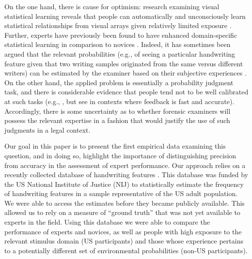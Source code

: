 \documentclass[doc]{apa6} %
\begin{document}
On the one hand, there is cause for optimism: research examining visual statistical learning reveals that people can automatically and unconsciously learn statistical relationships from visual arrays given relatively limited exposure \cite{Fiser2001,fiser2002,turkbrowne2005}. Further, experts have previously been found to have enhanced domain-specific statistical learning in comparison to novices \cite{schon2011musicalexpertise}. Indeed, it has sometimes been argued that the relevant probabilities (e.g., of seeing a particular handwriting feature given that two writing samples originated from the same versus different writers) can be estimated by the examiner based on their subjective experiences \cite{Biedermann2013}. On the other hand, the applied problem is essentially a probability judgment task, and there is considerable evidence that people tend not to be well calibrated at such tasks (e.g., , but see  in contexts where feedback is fast and accurate). Accordingly, there is some uncertainty as to whether forensic examiners will possess the relevant expertise in a fashion that would justify the use of such judgments in a legal context.

Our goal in this paper is to present the first empirical data examining this question, and in doing so, highlight the importance of distinguishing precision from accuracy in the assessment of expert performance. Our approach relies on a recently collected database of handwriting features \cite{johnson2016measuring}. This database was funded by the US National Institute of Justice (NIJ) to statistically estimate the frequency of handwriting features in a sample representative of the US adult population. We were able to access the estimates before they became publicly available. This allowed us to rely on a measure of ``ground truth'' that was not yet available to experts in the field. Using this database we were able to compare the performance of experts and novices, as well as people with high exposure to the relevant stimulus domain (US participants) and those whose experience pertains to a potentially different set of environmental probabilities (non-US participants).
\end{document}
